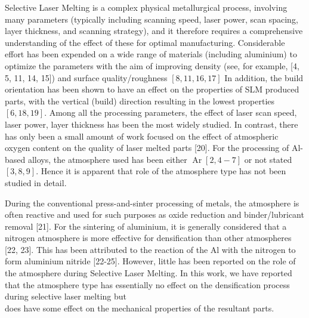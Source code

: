 \documentclass[10pt]{article}
\begin{document}
Selective Laser Melting is a complex physical metallurgical process, involving many parameters (typically including scanning speed, laser power, scan spacing, layer thickness, and scanning strategy), and it therefore requires a comprehensive understanding of the effect of these for optimal manufacturing. Considerable effort has been expended on a wide range of materials (including aluminium) to optimize the parameters with the aim of improving density (see, for example, [4, 5, 11, 14, 15]) and surface quality/roughness $[8,11,16,17]$ In addition, the build orientation has been shown to have an effect on the properties of SLM produced parts, with the vertical (build) direction resulting in the lowest properties $[6,18,19]$. Among all the processing parameters, the effect of laser scan speed, laser power, layer thickness has been the most widely studied. In contrast, there has only been a small amount of work focused on the effect of atmospheric oxygen content on the quality of laser melted parts [20]. For the processing of Al-based alloys, the atmosphere used has been either $\operatorname{Ar}[2,4-7]$ or not stated $[3,8,9]$. Hence it is apparent that role of the atmosphere type has not been studied in detail.

During the conventional press-and-sinter processing of metals, the atmosphere is often reactive and used for such purposes as oxide reduction and binder/lubricant removal [21]. For the sintering of aluminium, it is generally considered that a nitrogen atmosphere is more effective for densification than other atmospheres [22, 23]. This has been attributed to the reaction of the $\mathrm{Al}$ with the nitrogen to form aluminium nitride [22-25]. However, little has been reported on the role of the atmosphere during Selective Laser Melting. In this work, we have reported that the atmosphere type has essentially no effect on the densification process during selective laser melting but\\
does have some effect on the mechanical properties of the resultant parts.
\end{document}

